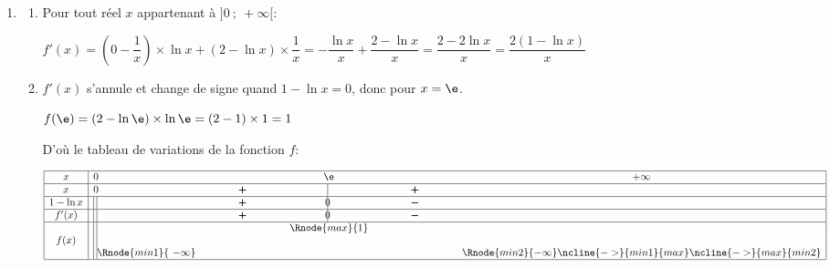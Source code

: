 \begin{enumerate}
Les coordonnées des  points d'intersection de la courbe $C$ et de l'axe des abscisses sont donc \\$(1\;;\;0)$ et $(\e^{2}\;;\;0)$.

	\item \begin{enumerate}
		\item Pour tout réel $x$ appartenant à $]0~;~+\infty[$: %
		
$f'(x)= \left (0-\dfrac{1}{x}\right ) \times \ln x + (2-\ln x)\times \dfrac{1}{x}
= -\dfrac{\ln x}{x} + \dfrac{2-\ln x}{x}
= \dfrac{2-2\ln x}{x}
= \dfrac{2 \left (1-\ln x\right )}{x}$

		\item %
$f'(x)$ s'annule et change de signe quand $1-\ln x = 0$, donc pour $x=\e$.

$f(\e)= (2-\ln\e)\times \ln\e = (2-1)\times 1=1$

D'où le tableau de variations de la fonction $f$:

\begin{center}
{\renewcommand{\arraystretch}{1.3}
\def\esp{\hspace*{2.5cm}}%
\def\hauteur{0pt}%
$\begin{array}{|c| l *4{c}|}
\hline
x & 0  & \esp & \e & \esp & +\infty \\ 
\hline
x & 0  &   \pmb{+} & \vline\hspace{-2.7pt}{\phantom 0} & \pmb{+} & \\ 
\hline
1-\ln x &\vline\;\vline  &   \pmb{+} & \vline\hspace{-2.7pt}0 & \pmb{-} & \\ 
\hline
f'(x) &\vline\;\vline  &   \pmb{+} & \vline\hspace{-2.7pt}0 & \pmb{-} & \\ 
\hline
 &\vline\;\vline &  &   \Rnode{max}{1}  &  &   \\  
f(x) &\vline\;\vline &     &  &  &  \rule{0pt}{\hauteur} \\ 
 &\vline\;\vline \Rnode{min1}{~-\infty} &   &  &  &   \Rnode{min2}{-\infty} \rule{0pt}{\hauteur}    
 \ncline{->}{min1}{max} 
 \ncline{->}{max}{min2} 
 \\ 
\hline
\end{array} $
}
\end{center}			


\end{enumerate}
\end{enumerate}
